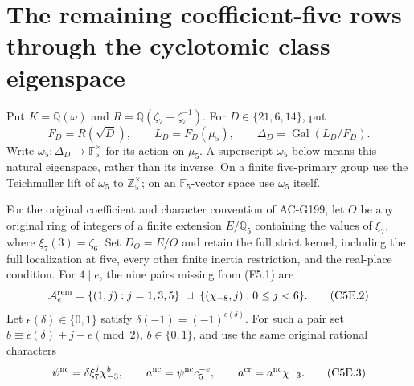 \section{The remaining coefficient-five rows through the cyclotomic class eigenspace}
\label{sec:coefficient-five-cyclotomic-eigenspace}

Put $K=\mathbb Q(\omega)$ and $R=\mathbb Q(\zeta_7+\zeta_7^{-1})$.  For
$D\in\{21,6,14\}$, put
\[
 F_D=R(\sqrt D),\qquad L_D=F_D(\mu_5),\qquad
 \Delta_D=\operatorname{Gal}(L_D/F_D).
 \tag{C5E.1}
\]
Write $\omega_5:\Delta_D\to\mathbb F_5^\times$ for its
action on $\mu_5$.  A superscript $\omega_5$ below means
this natural eigenspace, rather than its inverse.  On a finite
five-primary group use the Teichmuller lift of $\omega_5$ to
$\mathbb Z_5^\times$; on an $\mathbb F_5$-vector space use
$\omega_5$ itself.

For the original coefficient and character convention of AC-G199,
let $O$ be any original ring of integers of a finite extension
$E/\mathbb Q_5$ containing the values of $\xi_7$, where
$\xi_7(3)=\zeta_6$.  Set $D_O=E/O$ and retain the full strict
kernel, including the full localization at five, every other
finite inertia restriction, and the real-place condition.
For $4\mid e$, the nine pairs missing from (F5.1) are
\[
 \mathcal A_e^{\rm rem}
   =\{(1,j):j=1,3,5\}\ \sqcup\
                  \{(\chi_{-8},j):0\leq j<6\}.
 \tag{C5E.2}
\]
Let $\epsilon(\delta)\in\{0,1\}$ satisfy
$\delta(-1)=(-1)^{\epsilon(\delta)}$.  For such a pair set
$b\equiv\epsilon(\delta)+j-e\pmod2$,
$b\in\{0,1\}$, and use the same original rational characters
\[
 \psi^{\rm nc}=\delta\xi_7^j\chi_{-3}^b,
 \qquad a^{\rm nc}=\psi^{\rm nc}c_5^{-e},
 \qquad a^{\rm cr}=a^{\rm nc}\chi_{-3}.
 \tag{C5E.3}
\]


